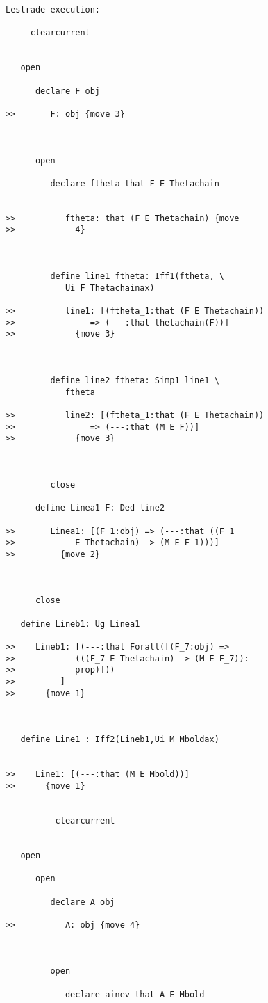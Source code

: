 \documentclass[12pt]{article}
\begin{document}
\begin{verbatim}Lestrade execution:

     clearcurrent


   open

      declare F obj

>>       F: obj {move 3}



      open

         declare ftheta that F E Thetachain


>>          ftheta: that (F E Thetachain) {move
>>            4}



         define line1 ftheta: Iff1(ftheta, \
            Ui F Thetachainax)

>>          line1: [(ftheta_1:that (F E Thetachain))
>>               => (---:that thetachain(F))]
>>            {move 3}



         define line2 ftheta: Simp1 line1 \
            ftheta

>>          line2: [(ftheta_1:that (F E Thetachain))
>>               => (---:that (M E F))]
>>            {move 3}



         close

      define Linea1 F: Ded line2

>>       Linea1: [(F_1:obj) => (---:that ((F_1
>>            E Thetachain) -> (M E F_1)))]
>>         {move 2}



      close

   define Lineb1: Ug Linea1

>>    Lineb1: [(---:that Forall([(F_7:obj) =>
>>            (((F_7 E Thetachain) -> (M E F_7)):
>>            prop)]))
>>         ]
>>      {move 1}



   define Line1 : Iff2(Lineb1,Ui M Mboldax)


>>    Line1: [(---:that (M E Mbold))]
>>      {move 1}


          clearcurrent


   open

      open

         declare A obj

>>          A: obj {move 4}



         open

            declare ainev that A E Mbold



\end{verbatim}
\end{document}
